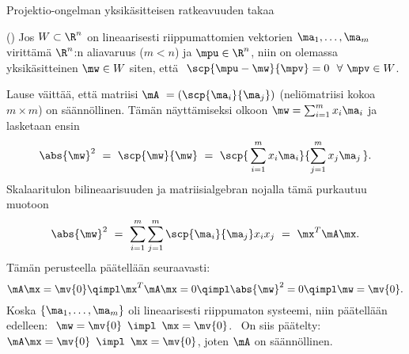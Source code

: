 Projektio-ongelman yksikäsitteisen ratkeavuuden takaa
\begin{Lause} \label{projektiolause} () Jos $W \subset \R^n$ on
lineaarisesti riippumattomien vektorien $\ma_1, \ldots, \ma_m$ virittämä $\R^n$:n aliavaruus 
($m<n$) ja $\mpu \in \R^n$, niin on olemassa yksikäsitteinen $\mw \in W$ siten, että 
$\ \scp{\mpu-\mw}{\mpv} = 0\ \ \forall\ \mpv \in W$. 
\end{Lause}
\tod Lause väittää, että matriisi $\mA\ = (\scp{\ma_i}{\ma_j})$ 
(neliömatriisi kokoa $m \times m$) on säännöllinen. Tämän näyttämiseksi olkoon
$\mw=\sum_{i=1}^m x_i\ma_i$ ja lasketaan ensin
\[ 
\abs{\mw}^2\  =\ \scp{\mw}{\mw}\ =\ \scp{\,\sum_{i=1}^m x_i \ma_i}{\sum_{j=1}^m x_j \ma_j\,}. 
\]
Skalaaritulon bilineaarisuuden ja matriisialgebran nojalla tämä purkautuu muotoon
\[ 
\abs{\mw}^2\ =\ \sum_{i=1}^m \sum_{j=1}^m \scp{\ma_i}{\ma_j} x_i x_j\ =\ \mx^T \mA\mx. 
\]
Tämän perusteella päätellään seuraavasti:
\[ 
\mA\mx = \mv{0} \qimpl \mx^T \mA\mx = 0 \qimpl \abs{\mw}^2 = 0 \qimpl \mw = \mv{0}. 
\]
Koska $\{\ma_1, \ldots, \ma_m\}$ oli lineaarisesti riippumaton systeemi, niin päätellään 
edelleen: $\ \mw=\mv{0}\,\ \impl\,\ \mx=\mv{0}$. \ On siis päätelty:\,
$\mA\mx=\mv{0}\,\ \impl\,\ \mx=\mv{0}$, joten $\mA$ on säännöllinen. \loppu

